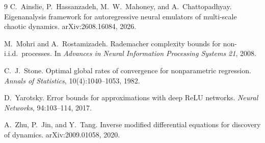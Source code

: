 \documentclass[11pt]{article}
\theoremstyle{definition}
\theoremstyle{remark}
\begin{document}
\begin{thebibliography}{9}
C.~Ainslie, P.~Hassanzadeh, M.~W.~Mahoney, and A.~Chattopadhyay.
Eigenanalysis framework for autoregressive neural emulators of multi-scale chaotic dynamics.
arXiv:2608.16084, 2026.

M.~Mohri and A.~Rostamizadeh.
Rademacher complexity bounds for non-i.i.d.\ processes.
In \emph{Advances in Neural Information Processing Systems 21}, 2008.

C.~J.~Stone.
Optimal global rates of convergence for nonparametric regression.
\emph{Annals of Statistics}, 10(4):1040--1053, 1982.

D.~Yarotsky.
Error bounds for approximations with deep ReLU networks.
\emph{Neural Networks}, 94:103--114, 2017.

A.~Zhu, P.~Jin, and Y.~Tang.
Inverse modified differential equations for discovery of dynamics.
arXiv:2009.01058, 2020.
\end{thebibliography}
\end{document}
